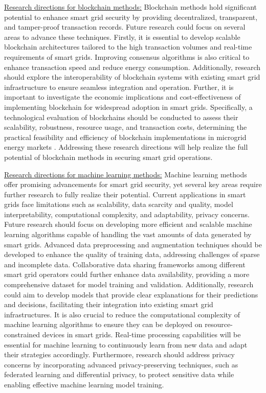 \documentclass[10pt, journal]{IEEEtran}
\begin{document}
\underline{Research directions for blockchain methods:} Blockchain methods hold significant potential to enhance smart grid security by providing decentralized, transparent, and tamper-proof transaction records. Future research could focus on several areas to advance these techniques. Firstly, it is essential to develop scalable blockchain architectures tailored to the high transaction volumes and real-time requirements of smart grids. Improving consensus algorithms is also critical to enhance transaction speed and reduce energy consumption. Additionally, research should explore the interoperability of blockchain systems with existing smart grid infrastructure to ensure seamless integration and operation. Further, it is important to investigate the economic implications and cost-effectiveness of implementing blockchain for widespread adoption in smart grids. Specifically, a technological evaluation of blockchains should be conducted to assess their scalability, robustness, resource usage, and transaction costs, determining the practical feasibility and efficiency of blockchain implementations in microgrid energy markets \cite{mengelkamp2018designing}. Addressing these research directions will help realize the full potential of blockchain methods in securing smart grid operations.

\underline{Research directions for machine learning methods:} Machine learning methods offer promising advancements for smart grid security, yet several key areas require further research to fully realize their potential. Current applications in smart grids face limitations such as scalability, data scarcity and quality, model interpretability, computational complexity, and adaptability, privacy concerns. Future research should focus on developing more efficient and scalable machine learning algorithms capable of handling the vast amounts of data generated by smart grids. Advanced data preprocessing and augmentation techniques should be developed to enhance the quality of training data, addressing challenges of sparse and incomplete data. Collaborative data sharing frameworks among different smart grid operators could further enhance data availability, providing a more comprehensive dataset for model training and validation. Additionally, research could aim to develop models that provide clear explanations for their predictions and decisions, facilitating their integration into existing smart grid infrastructures. It is also crucial to reduce the computational complexity of machine learning algorithms to ensure they can be deployed on resource-constrained devices in smart grids. Real-time processing capabilities will be essential for machine learning to continuously learn from new data and adapt their strategies accordingly. Furthermore, research should address privacy concerns by incorporating advanced privacy-preserving techniques, such as federated learning and differential privacy, to protect sensitive data while enabling effective machine learning model training.
\end{document}
